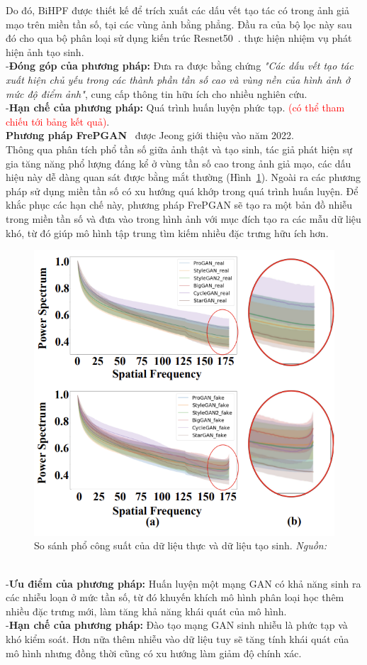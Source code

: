 Do đó, BiHPF được thiết kế để trích xuất các dấu vết tạo tác có trong ảnh giả mạo trên miền tần số, tại các vùng ảnh bằng phẳng. Đầu ra của bộ lọc này sau đó cho qua bộ phân loại sử dụng kiến trúc Resnet50~\cite{He2015DeepRL}. thực hiện nhiệm vụ phát hiện ảnh tạo sinh.\\
%
-\textbf{Đóng góp của phương pháp:}
Đưa ra được bằng chứng \textit{"Các dấu vết tạo tác xuất hiện chủ yếu trong các thành phần tần số cao và vùng nền của hình ảnh ở mức độ điểm ảnh"}, cung cấp thông tin hữu ích cho nhiều nghiên cứu.\\
%
-\textbf{Hạn chế của phương pháp:}
Quá trình huấn luyện phức tạp. \textcolor{red}{(có thể tham chiếu tới bảng kết quả)}.\\
%
\textbf{Phương pháp FrePGAN}~\cite{Jeong2022FrePGANRD} được Jeong giới thiệu vào năm 2022.\\
Thông qua phân tích phổ tần số giữa ảnh thật và tạo sinh, tác giả phát hiện sự gia tăng năng phổ lượng đáng kể ở vùng tần số cao trong ảnh giả mạo, các dấu hiệu này dễ dàng quan sát được bằng mắt thường (Hình~\ref{fig:freqgan-power-spectrum-1}). Ngoài ra các phương pháp sử dụng miền tần số có xu hướng quá khớp trong quá trình huấn luyện. Để khắc phục các hạn chế này, phương pháp FrePGAN sẽ tạo ra một bản đồ nhiễu trong miền tần số và đưa vào trong hình ảnh với mục đích tạo ra các mẫu dữ liệu khó, từ đó giúp mô hình tập trung tìm kiếm nhiều đặc trưng hữu ích hơn. 
%
\begin{figure}[ht!]
	\centering
	\includegraphics[width=0.7\linewidth]{Images/freqgan-power-spectrum-1.png}
	\begin{minipage}{0.9\linewidth}
		\caption{So sánh phổ công suất của dữ liệu thực và dữ liệu tạo sinh. \textit{Nguồn: \cite{Jeong2022FrePGANRD}}}
		\label{fig:freqgan-power-spectrum-1}
	\end{minipage}
\end{figure}\\
%
-\textbf{Ưu điểm của phương pháp:} Huấn luyện một mạng GAN có khả năng sinh ra các nhiễu loạn ở mức tần số, từ đó khuyến khích mô hình phân loại học thêm nhiều đặc trưng mới, làm tăng khả năng khái quát của mô hình.\\
-\textbf{Hạn chế của phương pháp:} Đào tạo mạng GAN sinh nhiễu là phức tạp và khó kiểm soát. Hơn nữa thêm nhiễu vào dữ liệu tuy sẽ tăng tính khái quát của mô hình nhưng đồng thời cũng có xu hướng làm giảm độ chính xác.
%
%
%
